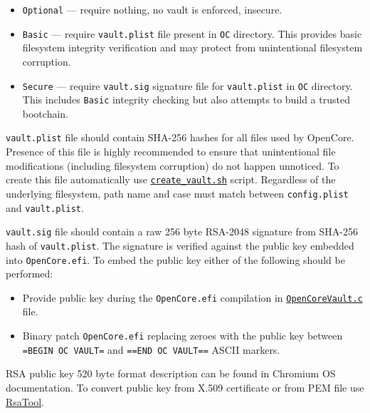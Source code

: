 \documentclass[]{article}
\providecommand{\tightlist}{%
  \setlength{\itemsep}{0pt}\setlength{\parskip}{0pt}}
\begin{document}
\begin{enumerate}
  \begin{itemize}
  \tightlist
  \item \texttt{Optional} --- require nothing, no vault is enforced, insecure.
  \item \texttt{Basic} --- require \texttt{vault.plist} file present
  in \texttt{OC} directory. This provides basic filesystem integrity
  verification and may protect from unintentional filesystem corruption.
  \item \texttt{Secure} --- require \texttt{vault.sig} signature file for
  \texttt{vault.plist} in \texttt{OC} directory. This includes \texttt{Basic}
  integrity checking but also attempts to build a trusted bootchain.
  \end{itemize}

  \texttt{vault.plist} file should contain SHA-256 hashes for all files used by OpenCore.
  Presence of this file is highly recommended to ensure that unintentional
  file modifications (including filesystem corruption) do not happen unnoticed.
  To create this file automatically use
  \href{https://github.com/acidanthera/OpenCorePkg/tree/master/Utilities/CreateVault}{\texttt{create\_vault.sh}} script.
  Regardless of the underlying filesystem, path name and case must match
  between \texttt{config.plist} and \texttt{vault.plist}.

  \texttt{vault.sig} file should contain a raw 256 byte RSA-2048 signature from SHA-256
  hash of \texttt{vault.plist}. The signature is verified against the public
  key embedded into \texttt{OpenCore.efi}. To embed the public key either of the following should be performed:

  \begin{itemize}
  \tightlist
  \item Provide public key during the \texttt{OpenCore.efi} compilation in
  \href{https://github.com/acidanthera/OpenCorePkg/blob/master/Platform/OpenCore/OpenCoreVault.c}{\texttt{OpenCoreVault.c}} file.
  \item Binary patch \texttt{OpenCore.efi} replacing zeroes with the public key
  between \texttt{=BEGIN OC VAULT=} and \texttt{==END OC VAULT==} ASCII markers.
  \end{itemize}

  RSA public key 520 byte format description can be found in Chromium OS documentation.
  To convert public key from X.509 certificate or from PEM file use
  \href{https://github.com/acidanthera/OpenCorePkg/tree/master/Utilities/CreateVault}{RsaTool}.



\end{enumerate}
\end{document}
